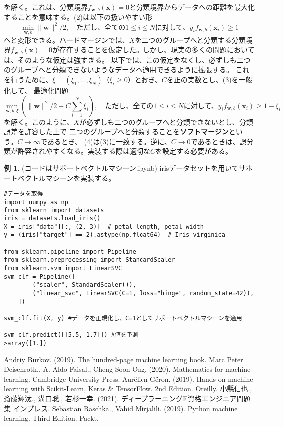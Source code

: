 \documentclass{jsarticle}
\theoremstyle{definition}
\newtheorem{ex}{例}[section]
\begin{document}
を解く。これは、分類境界$f_{\mathbf{w},b}(\mathbf{x})=0$と分類境界からデータへの距離を最大化することを意味する。(2)は以下の扱いやすい形
\begin{equation}
\min_{\mathbf{w},b}\|\mathbf{w}\|^{2}/2,\quad \text{ただし、全ての$1\leq i\leq N$に対して、$y_{i}f_{\mathbf{w},b}(\mathbf{x}_{i})\geq 1$}
\end{equation}
へと変形できる。ハードマージンでは、$X$を二つのグループへと分類する分類境界$f_{\mathbf{w},b}(\mathbf{x})=0$が存在することを仮定した。しかし、現実の多くの問題においては、そのような仮定は強すぎる。
以下では、この仮定をなくし、必ずしも二つのグループへと分類できないようなデータへ適用できるように拡張する。
これを行うために、$\xi=(\xi_{1},\dots,\xi_{N})$（$\xi_{i}\geq 0$）とおき、$C$を正の実数とし、(3)を一般化して、
最適化問題
\begin{equation}
\min_{\mathbf{w},b,\xi}(\|\mathbf{w}\|^{2}/2+C\sum_{i=1}^{N}\xi_{i}),\quad \text{ただし、全ての$1\leq i\leq N$に対して、$y_{i}f_{\mathbf{w},b}(\mathbf{x}_{i})\geq 1-\xi_{i}$}
\end{equation}
を解く。このように、$X$が必ずしも二つのグループへと分類できないとし、分類誤差を許容した上で
二つのグループへと分類することを\textbf{ソフトマージン}という。$C\rightarrow\infty$であるとき、
(4)は(3)に一致する。逆に、$C\rightarrow 0$であるときは、誤分類が許容されやすくなる。実装する際は適切な$C$を設定する必要がある。
\begin{ex} (コードはサポートベクトルマシーン.ipynb) irisデータセットを用いてサポートベクトルマシーンを実装する。
\begin{verbatim}
#データを取得
import numpy as np
from sklearn import datasets
iris = datasets.load_iris()
X = iris["data"][:, (2, 3)]  # petal length, petal width
y = (iris["target"] == 2).astype(np.float64)  # Iris virginica

from sklearn.pipeline import Pipeline
from sklearn.preprocessing import StandardScaler
from sklearn.svm import LinearSVC
svm_clf = Pipeline([
        ("scaler", StandardScaler()),
        ("linear_svc", LinearSVC(C=1, loss="hinge", random_state=42)),
    ])

svm_clf.fit(X, y) #データを正規化し、C=1としてサポートベクトルマシーンを適用

svm_clf.predict([[5.5, 1.7]]) #値を予測
>array([1.])
\end{verbatim}
\end{ex}
\begin{thebibliography}{99}
 Andriy Burkov. (2019). The hundred-page machine learning book.
 Marc Peter Deisenroth., A. Aldo Faisal., Cheng Soon Ong. (2020). Mathematics for machine learning. Cambridge University Press.
 Aur\"{e}lien G\"{e}ron. (2019). Hands-on machine learning with Scikit-Learn, Keras \&  TensorFlow. 2nd Edition. Oreilly.
 小縣信也., 斎藤翔汰., 溝口聡., 若杉一幸. (2021). ディープラーニングE資格エンジニア問題集 インプレス.
 Sebastian Raschka., Vahid Mirjalili. (2019). Python machine learning. Third Edition. Packt.

\end{thebibliography}
\end{document}
